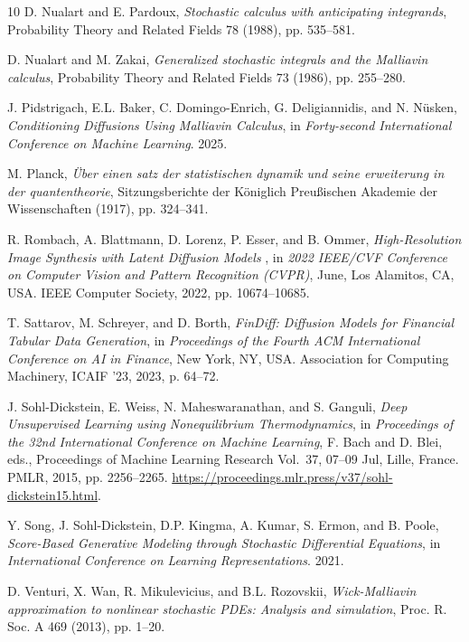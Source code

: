 \documentclass[]{interact}
\newcommand{\1}{\mathbf{1}}
\theoremstyle{plain}%
\theoremstyle{definition}
\theoremstyle{remark}
\numberwithin{equation}{section}
\begin{document}
\begin{thebibliography}{10}
D. Nualart and E. Pardoux, \emph{Stochastic calculus with anticipating integrands}, Probability Theory and Related Fields 78 (1988), pp. 535--581.

D. Nualart and M. Zakai, \emph{Generalized stochastic integrals and the {Malliavin} calculus}, Probability Theory and Related Fields 73 (1986), pp. 255--280.

J. Pidstrigach, E.L. Baker, C. Domingo-Enrich, G. Deligiannidis, and N. N{\"u}sken, \emph{Conditioning Diffusions Using Malliavin Calculus}, in \emph{Forty-second International Conference on Machine Learning}. 2025.

M. Planck, \emph{{\"U}ber einen satz der statistischen dynamik und seine erweiterung in der quantentheorie}, Sitzungsberichte der K{\"o}niglich Preu{\ss}ischen Akademie der Wissenschaften  (1917), pp. 324--341.

R. Rombach, A. Blattmann, D. Lorenz, P. Esser, and B. Ommer, \emph{{ High-Resolution Image Synthesis with Latent Diffusion Models }}, in \emph{2022 IEEE/CVF Conference on Computer Vision and Pattern Recognition (CVPR)}, June, Los Alamitos, CA, USA. IEEE Computer Society, 2022, pp. 10674--10685.

T. Sattarov, M. Schreyer, and D. Borth, \emph{FinDiff: Diffusion Models for Financial Tabular Data Generation}, in \emph{Proceedings of the Fourth ACM International Conference on AI in Finance}, New York, NY, USA. Association for Computing Machinery, ICAIF '23, 2023, p. 64–72.

J. Sohl-Dickstein, E. Weiss, N. Maheswaranathan, and S. Ganguli, \emph{Deep Unsupervised Learning using Nonequilibrium Thermodynamics}, in \emph{Proceedings of the 32nd International Conference on Machine Learning}, F. Bach and D. Blei, eds., Proceedings of Machine Learning Research Vol.~37, 07--09 Jul, Lille, France. PMLR, 2015, pp. 2256--2265. \urlprefix\url{https://proceedings.mlr.press/v37/sohl-dickstein15.html}.

Y. Song, J. Sohl-Dickstein, D.P. Kingma, A. Kumar, S. Ermon, and B. Poole, \emph{Score-Based Generative Modeling through Stochastic Differential Equations}, in \emph{International Conference on Learning Representations}. 2021.

D. Venturi, X. Wan, R. Mikulevicius, and B.L. Rozovskii, \emph{{W}ick-{M}alliavin approximation to nonlinear stochastic {PDEs}: Analysis and simulation}, Proc. R. Soc. A 469 (2013), pp. 1--20.

\end{thebibliography}


%
%
\end{document}
